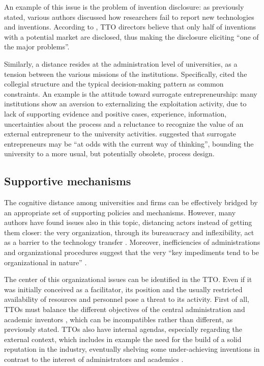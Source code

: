 An example of this issue is the problem of invention disclosure: as previously stated, various authors discussed how researchers fail to report new technologies and inventions. According to \citet{Jensen2003}, TTO directors believe that only half of inventions with a potential market are disclosed, thus making the disclosure eliciting \enquote{one of the major problems}.

Similarly, a distance resides at the administration level of universities, as a tension between the various missions of the institutions. Specifically, \citet{Guerrero2014} cited the collegial structure and the typical decision-making pattern as common constraints. An example is the attitude toward surrogate entrepreneurship: many institutions show an aversion to externalizing the exploitation activity, due to lack of supporting evidence and positive cases, experience, information, uncertainties about the process and a reluctance to recognize the value of an external entrepreneur to the university activities. \citet{Franklin2001} suggested that surrogate entrepreneurs may be \enquote{at odds with the current way of thinking}, bounding the university to a more usual, but potentially obsolete, process design. 

\subsection{Supportive mechanisms}

The cognitive distance among universities and firms can be effectively bridged by an appropriate set of supporting policies and mechanisms. However, many authors have found issues also in this topic, distancing actors instead of getting them closer: the very organization, through its bureaucracy and inflexibility, act as a barrier to the technology transfer \citep{Siegel2003a}. Moreover, inefficiencies of administrations and organizational procedures \citep{Baldini2007} suggest that the very \enquote{key impediments tend to be organizational in nature} \citep{Siegel2007}. 

The center of this organizational issues can be identified in the TTO. Even if it was initially conceived as a facilitator, its position and the usually restricted availability of resources and personnel pose a threat to its activity. First of all, TTOs must balance the different objectives of the central administration and academic inventors \citep{Jensen2003}, which can be incompatibles rather than different, as previously stated. TTOs also have internal agendas, especially regarding the external context, which includes in example the need for the build of a solid reputation in the industry, eventually shelving some under-achieving inventions in contrast to the interest of administrators and academics \citep{Siegel2007}. 

